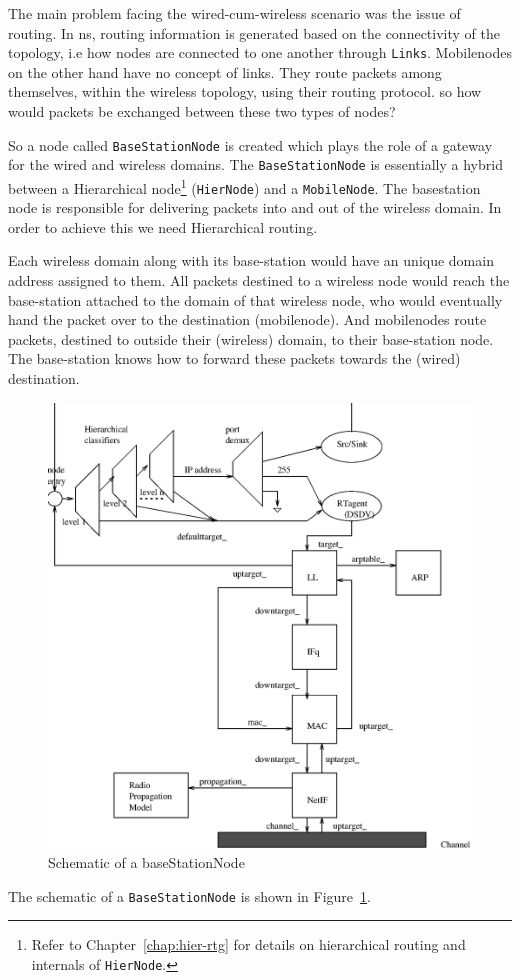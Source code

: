 The main problem facing the wired-cum-wireless scenario was the issue
of routing. In ns, routing information is generated based on the
connectivity of the topology, i.e how nodes are connected to one
another through {\tt Links}. Mobilenodes on the other hand have no
concept of links. They route packets among themselves, within the
wireless topology, using their routing protocol. so how would packets
be exchanged between these two types of nodes? 

So a node called {\tt BaseStationNode} is created which plays the
role of a gateway for the wired and wireless domains. The
{\tt BaseStationNode} is essentially a hybrid between a Hierarchical
node\footnote{Refer to Chapter~\ref{chap:hier-rtg} for details on
  hierarchical routing and internals of {\tt HierNode}.}
({\tt HierNode}) and a {\tt MobileNode}. The basestation node is
responsible for delivering packets into and out of the wireless
domain. In order to achieve this we need Hierarchical routing. 

Each wireless domain along with its base-station would have an unique
domain address assigned to them. All packets destined to a wireless
node would reach the base-station attached to the domain of that
wireless node, who would eventually hand the packet
over to the destination (mobilenode). And mobilenodes route packets,
destined to outside their (wireless) domain, to their base-station
node. The base-station knows how to forward these packets towards the
(wired) destination.
\begin{figure}
    \centerline{\includegraphics{basestation}}
    \caption{Schematic of a baseStationNode}
    \label{fig:mobilenode-basestation}
\end{figure}
The schematic of a {\tt BaseStationNode} is shown in
Figure~\ref{fig:mobilenode-basestation}.

